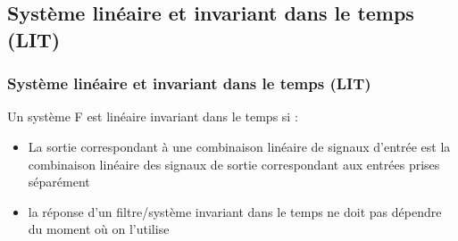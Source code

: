 \documentclass{beamer}
\begin{document}
\subsection{Système linéaire et invariant dans le  temps (LIT)}

\begin{frame}
\frametitle{Système linéaire et invariant dans le  temps (LIT) }

Un système F est linéaire invariant dans le temps si :
\vspace{0.3cm}
\begin{itemize}
\item La sortie correspondant à une combinaison linéaire de signaux d'entrée est la combinaison linéaire des signaux de sortie correspondant aux entrées prises séparément\\
\vspace{0.3cm}
\item la réponse d'un filtre/système invariant dans le temps ne doit pas dépendre du moment où on l'utilise\\
\end{itemize}

\end{frame} 
\end{document}
